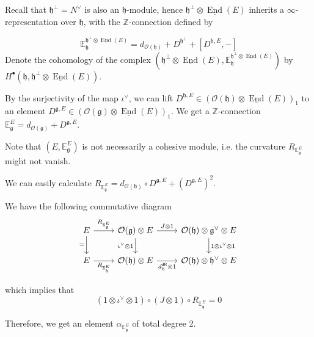 \documentclass[12pt]{amsart}
\theoremstyle{definition}
\theoremstyle{remark}
\numberwithin{equation}{section}
\newcommand{\CO}{{\mathcal O}}
\newcommand{\Z}{{\mathbb{Z}}}
\newcommand{\1}{{\mathbb{1}}}
\newcommand{\g}{\mathfrak{g}}
\newcommand{\h}{\mathfrak{h}}
\newcommand{\dr}{\mathsf{dR}}
\newcommand{\End}{\operatorname{End}}
\begin{document}
Recall that $\h^{\perp} = N^{\vee}$ is also an $\h$-module, hence $\h^{\perp}\otimes \underline{\End}(E)$ inherits a $\infty$-representation over $\h$, with the $\Z$-connection defined by

\begin{equation}
    \mathbb{E}^{\h^{\perp}\otimes \underline{\End}(E)}_{\h} = d_{\CO(\h)} + D^{\h^{\perp}} + [D^{\h, E}, -]
\end{equation}
Denote the cohomology of the complex $(\h^{\perp}\otimes \underline{\End}(E), \mathbb{E}_{\h}^{\h^{\perp}\otimes \underline{\End}(E)})$ by $H^{\bullet}(\h, \h^{\perp}\otimes \underline{\End}(E))$.

By the surjectivity of the map $\iota^{\vee}$, we can lift $D^{\h, E} \in (\CO(\h) \otimes \underline{\End}(E))_1$ to an element $D^{\g, E} \in (\CO(\g) \otimes \underline{\End}(E))_1$. We get a $\Z$-connection $\mathbb{E}_{\g}^E = d_{\CO(\g)} + D^{\g, E}$. 

Note that $(E, \mathbb{E}_{\g}^E)$ is not necessarily a cohesive module, i.e. the curvature $R_{\mathbb{E}_{\g}^E}$ might not vanish.

We can easily calculate $R_{\mathbb{E}_{\g}^E} = d_{\CO(\h)} \circ D^{\g, E} + (D^{\g, E})^2$.

We have the following commutative diagram
\[\begin{tikzcd}
	E & {\CO(\g)\otimes E} & {\CO(\h)\otimes \g^{\vee}\otimes E} \\
	E & {\CO(\h)\otimes E} & {\CO(\h)\otimes \h^{\vee}\otimes E}
	\arrow["{R_{\mathbb{E}_{\g}^E}}", from=1-1, to=1-2]
	\arrow["{J\otimes 1}", from=1-2, to=1-3]
	\arrow["{=}"', from=1-1, to=2-1]
	\arrow["{R_{\mathbb{E}_{\h}^E}}"', from=2-1, to=2-2]
	\arrow["{\iota^{\vee}\otimes 1}"', from=1-2, to=2-2]
	\arrow["{1\otimes \iota^{\vee}\otimes 1}", from=1-3, to=2-3]
	\arrow["{d^{\dr}_{\h} \otimes 1}"', from=2-2, to=2-3]
\end{tikzcd}\]

which implies that
\begin{equation*}
    (1\otimes \iota^{\vee}\otimes 1)\circ (J\otimes 1) \circ R_{\mathbb{E}_{\g}^E} = 0
\end{equation*}

Therefore, we get an element $\alpha_{\mathbb{E}_{\g}^E}$ of total degree 2.
\end{document}
